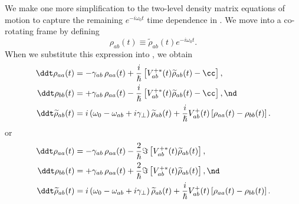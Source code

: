 We make one more simplification to the two-level density matrix equations of motion to capture the remaining $e^{-i \omega_0 t}$ time dependence in . We move into a co-rotating frame by defining
 \begin{equation}
\rho_{a b}(t) \equiv \widetilde{\rho}_{a b}(t) e^{-i \omega_0 t} .
 \end{equation}
When we substitute this expression into , we obtain
 \begin{subequations} \label{eqn:tls_dmem_rwa}
 \begin{align}
\label{eqn:tls_dmem_rwa_aa} \ddt \rho_{a a}(t) &= -\gamma_{a b}\, \rho_{a a}(t) + \frac{i}{\hslash} \left[ V^{+\ast}_{a b}(t) \widetilde{\rho}_{a b}(t) - \cc \right] , \\
\label{eqn:tls_dmem_rwa_bb} \ddt \rho_{b b}(t) &= +\gamma_{a b}\, \rho_{a a}(t) - \frac{i}{\hslash} \left[ V^{+\ast}_{a b}(t) \widetilde{\rho}_{a b}(t) - \cc \right] , \nd \\
\label{eqn:tls_dmem_rwa_ab} \ddt \widetilde{\rho}_{a b}(t) &= i \left( \omega_0 - \omega_{a b} + i \gamma_\perp \right) \widetilde{\rho}_{a b}(t) + \frac{i}{\hslash} V^+_{a b}(t) \left[ \rho_{a a}(t) - \rho_{b b}(t) \right] .
 \end{align}
 \end{subequations}
or
 \begin{subequations} \label{eqn:tls_dmem_rwa_smp}
 \begin{align}
\label{eqn:tls_dmem_rwa_smp_aa} \ddt \rho_{a a}(t) &= -\gamma_{a b}\, \rho_{a a}(t) - \frac{2}{\hslash} \Im \left[ V^{+\ast}_{a b}(t) \widetilde{\rho}_{a b}(t) \right] , \\
\label{eqn:tls_dmem_rwa_smp_bb} \ddt \rho_{b b}(t) &= +\gamma_{a b}\, \rho_{a a}(t) + \frac{2}{\hslash} \Im \left[ V^{+\ast}_{a b}(t) \widetilde{\rho}_{a b}(t) \right] , \nd \\
\label{eqn:tls_dmem_rwa_smp_ab} \ddt \widetilde{\rho}_{a b}(t) &= i \left( \omega_0 - \omega_{a b} + i \gamma_\perp \right) \widetilde{\rho}_{a b}(t) + \frac{i}{\hslash} V^+_{a b}(t) \left[ \rho_{a a}(t) - \rho_{b b}(t) \right] .
 \end{align}
 \end{subequations}

